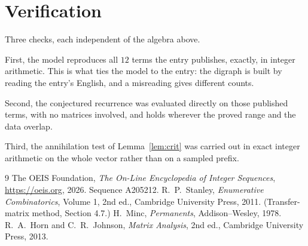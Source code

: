 \documentclass[11pt,a4paper]{article}
\theoremstyle{plain}
\theoremstyle{definition}
\begin{document}
\section{Verification}

Three checks, each independent of the algebra above.

First, the model reproduces all $12$ terms the entry publishes, exactly, in integer
arithmetic. This is what ties the model to the entry: the digraph is built by reading the
entry's English, and a misreading gives different counts.

Second, the conjectured recurrence was evaluated directly on those published terms, with no
matrices involved, and holds wherever the proved range and the data overlap.

Third, the annihilation test of Lemma~\ref{lem:crit} was carried out in exact integer
arithmetic on the whole vector rather than on a sampled prefix.

\begin{thebibliography}{9}
 The OEIS Foundation, \emph{The On-Line Encyclopedia of Integer
Sequences}, \url{https://oeis.org}, 2026. Sequence A205212.
 R.~P.~Stanley, \emph{Enumerative Combinatorics}, Volume 1, 2nd ed.,
Cambridge University Press, 2011. (Transfer-matrix method, Section 4.7.)
 H.~Minc, \emph{Permanents}, Addison--Wesley, 1978.
 R.~A.~Horn and C.~R.~Johnson, \emph{Matrix Analysis}, 2nd ed., Cambridge
University Press, 2013.
\end{thebibliography}
\end{document}
